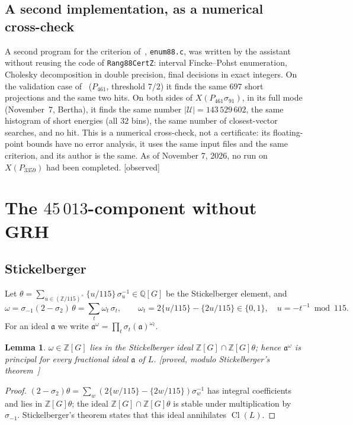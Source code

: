 \documentclass[11pt,a4paper]{amsart}
\theoremstyle{plain}
\newtheorem{lemma}[theorem]{Lemma}
\theoremstyle{definition}
\newcommand{\Q}{\mathbb{Q}}
\newcommand{\Z}{\mathbb{Z}}
\newcommand{\aaa}{\mathfrak{a}}
\DeclareMathOperator{\Cl}{Cl}
\newcommand{\XA}{X(P_{3359})}
\newcommand{\XB}{X(P_{461}\sigma_{91})}
\newcommand{\st}[1]{\textup{\textsf{\small[#1]}}}
\newcommand{\CONS}{\st{observed}}
\begin{document}
\subsection{A second implementation, as a numerical cross-check}\label{subsec:enum88}
A second program for the criterion of~\cite[Thm.~4.6]{Gau26}, \texttt{enum88.c}, was written by the assistant without reusing the code of \texttt{Rang88CertZ}: interval Fincke--Pohst enumeration, Cholesky decomposition in double precision, final decisions in exact integers. On the validation case of~\cite[\S5.2]{Gau26} ($P_{461}$, threshold $7/2$) it finds the same $697$ short projections and the same two hits. On both sides of $\XB$, in its full mode (November~7, Bertha), it finds the same number $|\mathcal U|=143\,529\,602$, the same histogram of short energies (all $32$ bins), the same number of closest-vector searches, and no hit. This is a numerical cross-check, not a certificate: its floating-point bounds have no error analysis, it uses the same input files and the same criterion, and its author is the same. As of November 7, 2026, no run on $\XA$ had been completed. \CONS

\section{The \texorpdfstring{$45\,013$}{45013}-component without GRH}\label{sec:45013}

\subsection{Stickelberger}
Let $\theta=\sum_{u\in(\Z/115)^\times}\{u/115\}\,\sigma_u^{-1}\in\Q[G]$ be the Stickelberger element, and
\[
\omega=\sigma_{-1}(2-\sigma_2)\,\theta=\sum_{t}\omega_t\,\sigma_t,\qquad \omega_t=2\{u/115\}-\{2u/115\}\in\{0,1\},\quad u=-t^{-1}\bmod 115 .
\]
For an ideal $\aaa$ we write $\aaa^\omega=\prod_t\sigma_t(\aaa)^{\omega_t}$.

\begin{lemma}\label{lem:stick}
$\omega\in\Z[G]$ lies in the Stickelberger ideal $\Z[G]\cap\Z[G]\theta$; hence $\aaa^\omega$ is principal for every fractional ideal $\aaa$ of $L$. \st{proved, modulo Stickelberger's theorem~\cite[Thm.~6.10]{Was97}}
\end{lemma}

\begin{proof}
$(2-\sigma_2)\theta=\sum_w(2\{w/115\}-\{2w/115\})\sigma_w^{-1}$ has integral coefficients and lies in $\Z[G]\theta$; the ideal $\Z[G]\cap\Z[G]\theta$ is stable under multiplication by $\sigma_{-1}$. Stickelberger's theorem states that this ideal annihilates $\Cl(L)$.
\end{proof}
\end{document}
